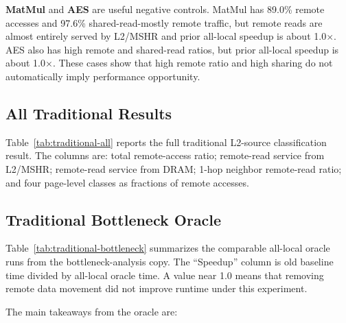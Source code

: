 \documentclass[sigconf,screen,review,anonymous]{acmart}
\begin{document}
\textbf{MatMul} and \textbf{AES} are useful negative controls.  MatMul has
89.0\% remote accesses and 97.6\% shared-read-mostly remote traffic, but remote
reads are almost entirely served by L2/MSHR and prior all-local speedup is about
1.0$\times$.  AES also has high remote and shared-read ratios, but prior
all-local speedup is about 1.0$\times$.  These cases show that high remote ratio
and high sharing do not automatically imply performance opportunity.

\subsection{All Traditional Results}

Table~\ref{tab:traditional-all} reports the full traditional L2-source
classification result.  The columns are: total remote-access ratio; remote-read
service from L2/MSHR; remote-read service from DRAM; 1-hop neighbor remote-read
ratio; and four page-level classes as fractions of remote accesses.

\begin{table}[t]
  \centering
  \caption{Full traditional workload remote-access taxonomy from the latest
  L2-source run.}
  \label{tab:traditional-all}
  \resizebox{\textwidth}{!}{}
\end{table}

\subsection{Traditional Bottleneck Oracle}

Table~\ref{tab:traditional-bottleneck} summarizes the comparable all-local
oracle runs from the bottleneck-analysis copy.  The ``Speedup'' column is old
baseline time divided by all-local oracle time.  A value near 1.0 means that
removing remote data movement did not improve runtime under this experiment.

\begin{table}[t]
  \centering
  \caption{Traditional all-local data oracle results.  Translation still goes
  through the IOMMU, so this isolates data movement more than address
  translation.}
  \label{tab:traditional-bottleneck}
  \resizebox{\textwidth}{!}{}
\end{table}

The main takeaways from the oracle are:
\end{document}
